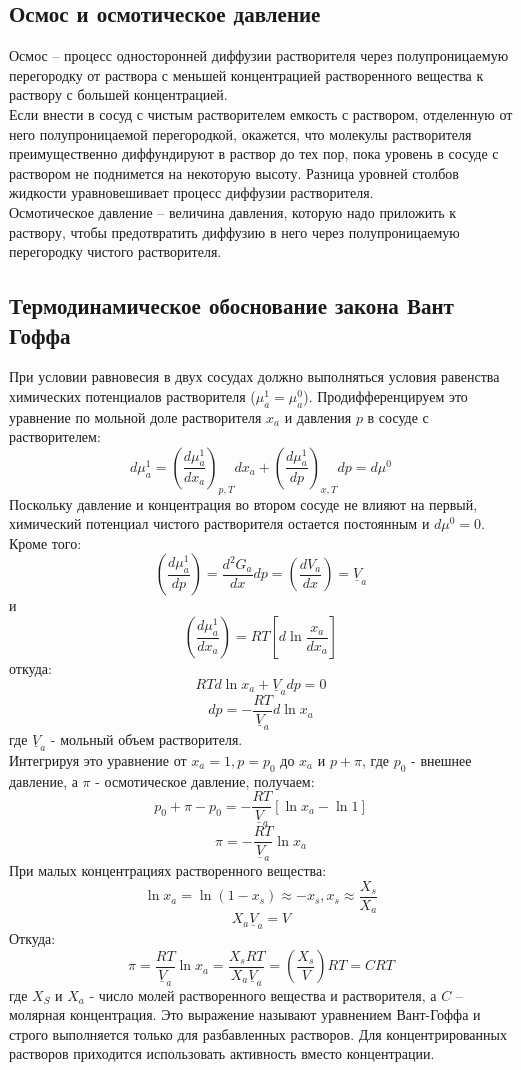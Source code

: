 \documentclass[14pt,a4paper]{scrartcl}
\begin{document}
\subsection*{Осмос и осмотическое давление}
Осмос -- процесс односторонней диффузии растворителя через полупроницаемую перегородку от раствора с меньшей концентрацией растворенного вещества к раствору с большей концентрацией. \\
Если внести в сосуд с чистым растворителем емкость с раствором, отделенную от него полупроницаемой перегородкой, окажется, что молекулы растворителя преимущественно диффундируют в раствор до тех пор, пока уровень в сосуде с раствором не поднимется на некоторую высоту. Разница уровней столбов жидкости уравновешивает процесс диффузии растворителя.\\
Осмотическое давление -- величина давления, которую надо приложить к раствору, чтобы предотвратить диффузию в него через полупроницаемую перегородку чистого растворителя. 
\subsection*{Термодинамическое обоснование закона Вант Гоффа}
При условии равновесия в двух сосудах должно выполняться условия равенства химических потенциалов растворителя ($\mu_a^1 = \mu_a^0$). Продифференцируем это уравнение по мольной доле растворителя $x_a$ и давления $p$ в сосуде с растворителем:
$$ d\mu_a^1 = \left(\dfrac{d\mu_a^1}{dx_a} \right)_{p,T}dx_a + \left(\dfrac{d\mu_a^1}{dp} \right)_{x,T}dp = d\mu^0  $$
Поскольку давление и концентрация во втором сосуде не влияют на первый, химический потенциал чистого растворителя остается постоянным и $d\mu^0 =0 $. Кроме того:
$$ \left(\dfrac{ d\mu_a^1 }{dp}\right) = \dfrac{d^2G_a}{dx} dp = \left( \dfrac{dV_a}{dx} \right) = \underline{V}_a  $$
и
$$ \left(\dfrac{ d\mu_a^1 }{dx_a}\right) = RT \left[d\ln{\dfrac{x_a}{dx_a}}\right] $$
откуда:
$$ RT d \ln{x_a} + \underline{V}_a  dp = 0  $$
$$ dp = - \dfrac{RT}{\underline{V}_a} d \ln{x_a} $$
где $\underline{V}_a $ - мольный объем растворителя. \\
Интегрируя это уравнение от $x_a = 1, p=p_0$ до $x_a$ и $p+\pi$, где $p_0$ - внешнее давление, а $\pi$ - осмотическое давление, получаем:
$$ p_0 + \pi - p_0 = - \dfrac{RT}{\underline{V}_a} [\ln{x_a}- \ln{1}]  $$
$$ \pi = - \dfrac{RT}{\underline{V}_a} \ln{x_a} $$
При малых концентрациях растворенного вещества:
$$ \ln{x_a} = \ln{(1-x_s)} \approx -x_s, x_s \approx \dfrac{X_s}{X_a} $$
$$ X_a\underline{V}_a = V$$
Откуда:
$$ \pi = \dfrac{RT}{\underline{V}_a} \ln{x_a} = \dfrac{X_sRT}{X_a\underline{V}_a} = \left( \dfrac{X_s}{V}\right)RT = CRT $$
где $X_S$ и $X_a$ - число молей растворенного вещества и растворителя, а $C$ -- молярная концентрация. Это выражение называют уравнением Вант-Гоффа и строго выполняется только для разбавленных растворов. Для концентрированных растворов приходится использовать активность вместо концентрации.
\end{document}
